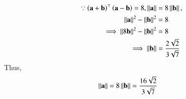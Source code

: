 \begin{align}
\because \brak{\vec{a}+\vec{b}}^\top\brak{\vec{a}-\vec{b}}=8,
\norm{\vec{a}} &= 8\norm{\vec{b}},\\
\norm{\vec{a}}^2-\norm{\vec{b}}^2&=8\\
\implies\norm{8\vec{b}}^2-\norm{\vec{b}}^2&=8\\
\implies \norm{\vec{b}}&=\frac{2\sqrt{2}}{3\sqrt{7}}
\end{align}
Thus, 
\begin{align}
\norm{\vec{a}}&=8\norm{\vec{b}}
=\frac{16\sqrt{2}}{3\sqrt{7}}
\end{align}

